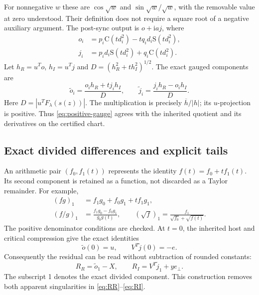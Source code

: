 \documentclass[11pt,a4paper]{article}
\numberwithin{equation}{section}
\newcommand{\iu}{\mathrm i}\newcommand{\one}{\mathbf 1}
\newcommand{\entC}{\mathrm C}\newcommand{\entS}{\mathrm S}
\begin{document}
For nonnegative $w$ these are $\cos\sqrt w$ and $\sin\sqrt w/\sqrt w$, with the removable value at zero understood. Their definition does not require a square root of a negative auxiliary argument. The post-sync output is $o+\iu a j$, where
\begin{equation}
\begin{aligned}
o_i&=p_i\entC(td_i^2)-tq_id_i\entS(td_i^2),\\
j_i&=p_id_i\entS(td_i^2)+q_i\entC(td_i^2).
\end{aligned}\label{eq:post-sync}
\end{equation}
Let $h_R=u^To$, $h_I=u^Tj$ and $D=(h_R^2+t h_I^2)^{1/2}$. The exact gauged components are
\begin{equation}
\widetilde o_i=\frac{o_i h_R+t j_i h_I}{D},\qquad
\widetilde j_i=\frac{j_i h_R-o_i h_I}{D}.\label{eq:positive-gauge}
\end{equation}
Here $D=|u^TF_\lambda(s(z))|$. The multiplication is precisely $\overline h/|h|$; its $u$-projection is positive. Thus \eqref{eq:positive-gauge} agrees with the inherited quotient and its derivatives on the certified chart.

\subsection{Exact divided differences and explicit tails}\label{sec:divided}
An arithmetic pair $(f_0,f_1(t))$ represents the identity $f(t)=f_0+t f_1(t)$. Its second component is retained as a function, not discarded as a Taylor remainder. For example,
\begin{align}
(fg)_1&=f_1g_0+f_0g_1+t f_1g_1,\label{eq:dd-product}\\
(f/g)_1&=\frac{f_1g_0-f_0g_1}{g_0g(t)},\qquad
(\sqrt f)_1=\frac{f_1}{\sqrt{f_0}+\sqrt{f(t)}}.\label{eq:dd-quotient}
\end{align}
The positive denominator conditions are checked. At $t=0$, the inherited host and critical compression give the exact identities
\begin{equation}
\widetilde o(0)=u,\qquad V^T\widetilde j(0)=-e.\label{eq:cancellations}
\end{equation}
Consequently the residual can be read without subtraction of rounded constants:
\begin{equation}
R_R=\widetilde o_1-X,\qquad
R_I=V^T\widetilde j_1+y e_\perp.\label{eq:regular-residual}
\end{equation}
The subscript 1 denotes the exact divided component. This construction removes both apparent singularities in \eqref{eq:RR}--\eqref{eq:RI}.
\end{document}
